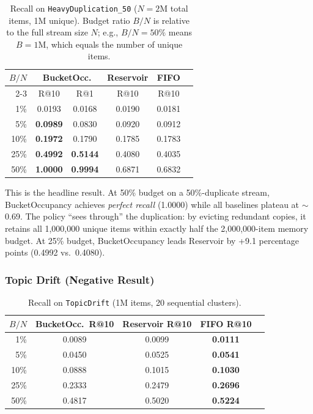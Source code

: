 \documentclass[conference]{IEEEtran}
\begin{document}
\begin{table}[h]
\centering
\caption{Recall on \texttt{HeavyDuplication\_50} ($N{=}2$M total items,
1M unique). Budget ratio $B/N$ is relative to the full stream size $N$;
e.g., $B/N{=}50\%$ means $B{=}1$M, which equals the number of unique items.}
\label{tab:heavy}
\begin{tabular}{@{}rccccc@{}}
\toprule
$B/N$ & \multicolumn{2}{c}{BucketOcc.} & Reservoir & FIFO \\
\cmidrule(lr){2-3}
      & R@10 & R@1 & R@10 & R@10 \\
\midrule
 1\% & 0.0193 & 0.0168 & 0.0190 & 0.0181 \\
 5\% & \textbf{0.0989} & 0.0830 & 0.0920 & 0.0912 \\
10\% & \textbf{0.1972} & 0.1790 & 0.1785 & 0.1783 \\
25\% & \textbf{0.4992} & \textbf{0.5144} & 0.4080 & 0.4035 \\
50\% & \textbf{1.0000} & \textbf{0.9994} & 0.6871 & 0.6832 \\
\bottomrule
\end{tabular}
\end{table}

This is the headline result. At 50\% budget on a 50\%-duplicate
stream, BucketOccupancy achieves \emph{perfect recall} (1.0000) while
all baselines plateau at $\sim$0.69. The policy ``sees through'' the
duplication: by evicting redundant copies, it retains all 1,000,000
unique items within exactly half the 2,000,000-item memory budget. At
25\% budget, BucketOccupancy leads Reservoir by +9.1 percentage points
(0.4992 vs.\ 0.4080).

\subsubsection{Topic Drift (Negative Result)}

\begin{table}[h]
\centering
\caption{Recall on \texttt{TopicDrift} (1M items, 20 sequential clusters).}
\label{tab:drift}
\begin{tabular}{@{}rcccc@{}}
\toprule
$B/N$ & BucketOcc.\ R@10 & Reservoir R@10 & FIFO R@10 \\
\midrule
 1\% & 0.0089 & 0.0099 & \textbf{0.0111} \\
 5\% & 0.0450 & 0.0525 & \textbf{0.0541} \\
10\% & 0.0888 & 0.1015 & \textbf{0.1030} \\
25\% & 0.2333 & 0.2479 & \textbf{0.2696} \\
50\% & 0.4817 & 0.5020 & \textbf{0.5224} \\
\bottomrule
\end{tabular}
\end{table}
\end{document}
